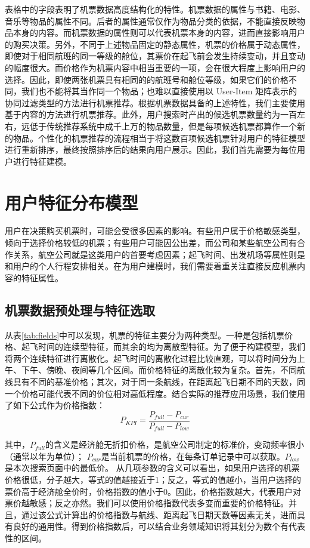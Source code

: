 表格中的字段表明了机票数据高度结构化的特性。机票数据的属性与书籍、电影、音乐等物品的属性不同。后者的属性通常仅作为物品分类的依据，不能直接反映物品本身的内容。而机票数据的属性则可以代表机票本身的内容，进而直接影响用户的购买决策。另外，不同于上述物品固定的静态属性，机票的价格属于动态属性，即使对于相同航班的同一等级的舱位，其票价在起飞前会发生持续变动，并且变动的幅度很大。而价格作为机票内容中相当重要的一项，会在很大程度上影响用户的选择。因此，即使两张机票具有相同的的航班号和舱位等级，如果它们的价格不同，我们也不能将其当作同一个物品；也难以直接使用以 User-Item 矩阵表示的协同过滤类型的方法进行机票推荐。根据机票数据具备的上述特性，我们主要使用基于内容的方法进行机票推荐。此外，用户搜索时产出的候选机票数量约为一百左右，远低于传统推荐系统中成千上万的物品数量，但是每项候选机票都算作一个新的物品。个性化的机票推荐的流程相当于将这数百项候选机票针对用户的特征模型进行重新排序，最终按照排序后的结果向用户展示。因此，我们首先需要为每位用户进行特征建模。

\section{用户特征分布模型}

用户在决策购买机票时，可能会受很多因素的影响。有些用户属于价格敏感类型，倾向于选择价格较低的机票；有些用户可能因公出差，而公司和某些航空公司有合作关系，航空公司就是这类用户的首要考虑因素；起飞时间、出发机场等属性则是和用户的个人行程安排相关。在为用户建模时，我们需要着重关注直接反应机票内容的特征属性。

\subsection{机票数据预处理与特征选取}

从表\ref{tab:fields}中可以发现，机票的特征主要分为两种类型。一种是包括机票价格、起飞时间的连续型特征，而其余的均为离散型特征。为了便于构建模型，我们将两个连续特征进行离散化。起飞时间的离散化过程比较直观，可以将时间分为上午、下午、傍晚、夜间等几个区间。而价格特征的离散化较为复杂。首先，不同航线具有不同的基准价格；其次，对于同一条航线，在距离起飞日期不同的天数，同一个价格可能代表不同的价位相对高低程度。结合实际的推荐应用场景，我们使用了如下公式作为价格指数：
\begin{equation}
	P_{KPI} = \frac{P_{full} - P_{cur}}{P_{full} - P_{low}}
\end{equation}

其中，$P_{full}$的含义是经济舱无折扣价格，是航空公司制定的标准价，变动频率很小（通常以年为单位）；
$P_{cur}$是当前机票的价格，在每条订单记录中可以获取。$P_{low}$是本次搜索页面中的最低价。
从几项参数的含义可以看出，如果用户选择的机票价格很低，分子越大，等式的值越接近于1；反之，等式的值越小，当用户选择的票价高于经济舱全价时，价格指数的值小于0。因此，价格指数越大，代表用户对票价越敏感；反之亦然。我们可以使用价格指数代表多变而重要的价格特征。并且，通过该公式计算出的价格指数与航线、距离起飞日期天数等因素无关，进而具有良好的通用性。得到价格指数后，可以结合业务领域知识将其划分为数个有代表性的区间。

